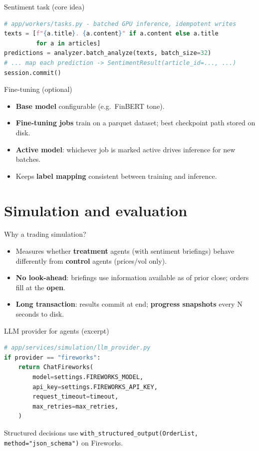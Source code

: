 \documentclass[aspectratio=169,11pt]{beamer}
\begin{document}
\begin{frame}[fragile]{Sentiment task (core idea)}
\begin{lstlisting}[language=Python]
# app/workers/tasks.py - batched GPU inference, idempotent writes
texts = [f"{a.title}. {a.content}" if a.content else a.title
         for a in articles]
predictions = analyzer.batch_analyze(texts, batch_size=32)
# ... map each prediction -> SentimentResult(article_id=..., ...)
session.commit()
\end{lstlisting}
\end{frame}

\begin{frame}{Fine-tuning (optional)}
  \begin{itemize}
    \item \textbf{Base model} configurable (e.g.\ FinBERT tone).
    \item \textbf{Fine-tuning jobs} train on a parquet dataset; best checkpoint path stored on disk.
    \item \textbf{Active model}: whichever job is marked active drives inference for new batches.
    \item Keeps \textbf{label mapping} consistent between training and inference.
  \end{itemize}
\end{frame}

\section{Simulation and evaluation}

\begin{frame}{Why a trading simulation?}
  \begin{itemize}
    \item Measures whether \textbf{treatment} agents (with sentiment briefings) behave differently from \textbf{control} agents (prices/vol only).
    \item \textbf{No look-ahead}: briefings use information available as of prior close; orders fill at the \textbf{open}.
    \item \textbf{Long transaction}: results commit at end; \textbf{progress snapshots} every N seconds to disk.
  \end{itemize}
\end{frame}

\begin{frame}[fragile]{LLM provider for agents (excerpt)}
\begin{lstlisting}[language=Python]
# app/services/simulation/llm_provider.py
if provider == "fireworks":
    return ChatFireworks(
        model=settings.FIREWORKS_MODEL,
        api_key=settings.FIREWORKS_API_KEY,
        request_timeout=timeout,
        max_retries=max_retries,
    )
\end{lstlisting}
  Structured decisions use \texttt{with\_structured\_output(OrderList, method="json\_schema")} on Fireworks.
\end{frame}
\end{document}
